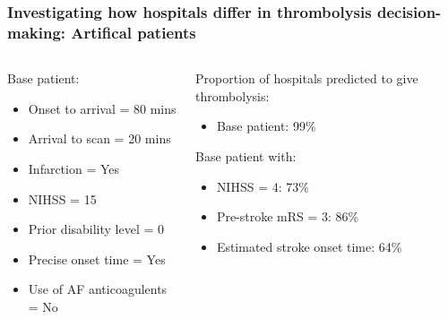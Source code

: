 \documentclass{beamer}
\begin{document}


\begin{frame}
\frametitle{Investigating how hospitals differ in thrombolysis decision-making: Artifical patients}

\vspace{3mm}

\begin{columns}[t]
    \begin{column}{0.45\textwidth}
        Base patient:
        \begin{itemize}
            \footnotesize
            \item Onset to arrival = 80 mins
            \item Arrival to scan = 20 mins
            \item Infarction = Yes
            \item NIHSS = 15
            \item Prior disability level = 0
            \item Precise onset time = Yes
            \item Use of AF anticoagulents = No
        \end{itemize}
    \end{column}
    
    \begin{column}{0.5\textwidth}
    Proportion of hospitals predicted to give thrombolysis:
    \footnotesize
    \begin{itemize}
        \item Base patient: 99\%
    \end{itemize}
    Base patient with:
    \begin{itemize}
        \item NIHSS = 4: 73\%
        \item Pre-stroke mRS = 3: 86\%
        \item Estimated stroke onset time: 64\%
    \end{itemize}
    \end{column}

\end{columns}
\end{frame}


\end{document}
